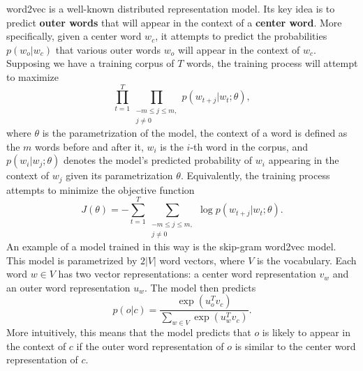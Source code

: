 word2vec is a well-known distributed representation model. Its key idea is to predict \textbf{outer words} that will appear in the context of a \textbf{center word}. More specifically, given a center word $w_c$, it attempts to predict the probabilities $p(w_o | w_c)$ that various outer words $w_o$ will appear in the context of $w_c$. Supposing we have a training corpus of $T$ words, the training process will attempt to maximize
$$\prod_{t=1}^T\prod_{\substack{-m \le j \le m,\\ j \ne 0}}p(w_{t+j} | w_t; \theta),$$
where $\theta$ is the parametrization of the model, the context of a word is defined as the $m$ words before and after it, $w_i$ is the $i$-th word in the corpus, and $p(w_i | w_j; \theta)$ denotes the model's predicted probability of $w_i$ appearing in the context of $w_j$ given its parametrization $\theta$. Equivalently, the training process attempts to minimize the objective function
$$J(\theta) = -\sum_{t=1}^T\sum_{\substack{-m \le j \le m,\\ j \ne 0}} \log p(w_{t+j} | w_t; \theta).$$
An example of a model trained in this way is the skip-gram word2vec model. This model is parametrized by $2|V|$ word vectors, where $V$ is the vocabulary. Each word $w \in V$ has two vector representations: a center word representation $v_w$ and an outer word representation $u_w$. The model then predicts
$$p(o | c) = \frac{\exp\left(u_o^T v_c\right)}{\sum_{w \in V} \exp\left(u_w^T v_c\right)}.$$
More intuitively, this means that the model predicts that $o$ is likely to appear in the context of $c$ if the outer word representation of $o$ is similar to the center word representation of $c$.

